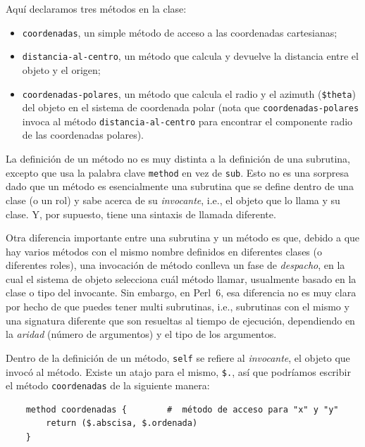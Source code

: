 Aquí declaramos tres métodos en la clase:
\begin{itemize}
\item {\tt coordenadas}, un simple método de acceso a
las coordenadas cartesianas;

\item{\tt distancia-al-centro}, un método que calcula y devuelve
la distancia entre el objeto y el origen;

\item{\tt coordenadas-polares}, un método que calcula el radio y 
el azimuth (\verb|$theta|) del objeto en el sistema de coordenada
polar (nota que {\tt coordenadas-polares} invoca al método 
{\tt distancia-al-centro} para encontrar el componente radio de las 
coordenadas polares).
\end{itemize}

La definición de un método no es muy distinta a la definición
de una subrutina, excepto que usa la palabra clave {\tt method}
en vez de {\tt sub}. Esto no es una sorpresa dado que un 
método es esencialmente una subrutina que se define dentro de
una clase (o un rol) y sabe acerca de su \emph{invocante}, i.e.,
el objeto que lo llama y su clase. Y, por supuesto, tiene una
sintaxis de llamada diferente.

Otra diferencia importante entre una subrutina y un método es
que, debido a que hay varios métodos con el mismo nombre
definidos en diferentes clases (o diferentes roles), una 
invocación de método conlleva un fase de \emph{despacho},
en la cual el sistema de objeto selecciona cuál método llamar,
usualmente basado en la clase o tipo del invocante. Sin embargo,
en Perl~6, esa diferencia no es muy clara por hecho de que 
puedes tener multi subrutinas, i.e., subrutinas con el mismo
y una signatura diferente que son resueltas al tiempo de ejecución,
dependiendo en la \emph{aridad} (número de argumentos) y el 
tipo de los argumentos.

Dentro de la definición de un método, {\tt self}
se refiere al \emph{invocante}, el objeto que invocó
al método. Existe un atajo para el mismo, \verb|$.|,
así que podríamos escribir el método {\tt coordenadas}
de la siguiente manera:

\begin{lstlisting}
    method coordenadas {        #  método de acceso para "x" y "y"
        return ($.abscisa, $.ordenada)
    }
\end{lstlisting}

